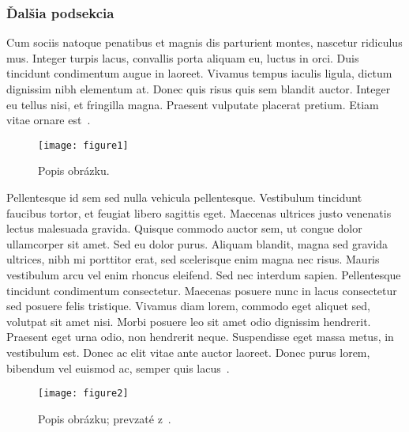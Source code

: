 
\subsubsection{Ďalšia podsekcia}
Cum sociis natoque penatibus et magnis dis parturient montes, nascetur ridiculus mus. Integer turpis lacus, convallis porta aliquam eu, luctus in orci. Duis tincidunt condimentum augue in laoreet. Vivamus tempus iaculis ligula, dictum dignissim nibh elementum at. Donec quis risus quis sem blandit auctor. Integer eu tellus nisi, et fringilla magna. Praesent vulputate placerat pretium. Etiam vitae ornare est~\cite{2}.\\

\begin{figure}[H]\begin{center}\texttt{[image: figure1]}
\caption{Popis obrázku.}\label{figure1}\end{center}\end{figure}

Pellentesque id sem sed nulla vehicula pellentesque. Vestibulum tincidunt faucibus tortor, et feugiat libero sagittis eget. Maecenas ultrices justo venenatis lectus malesuada gravida. Quisque commodo auctor sem, ut congue dolor ullamcorper sit amet. Sed eu dolor purus. Aliquam blandit, magna sed gravida ultrices, nibh mi porttitor erat, sed scelerisque enim magna nec risus. Mauris vestibulum arcu vel enim rhoncus eleifend. Sed nec interdum sapien. Pellentesque tincidunt condimentum consectetur. Maecenas posuere nunc in lacus consectetur sed posuere felis tristique. Vivamus diam lorem, commodo eget aliquet sed, volutpat sit amet nisi. Morbi posuere leo sit amet odio dignissim hendrerit. Praesent eget urna odio, non hendrerit neque. Suspendisse eget massa metus, in vestibulum est. Donec ac elit vitae ante auctor laoreet. Donec purus lorem, bibendum vel euismod ac, semper quis lacus~\cite{3}.

\begin{figure}[H]\begin{center}\texttt{[image: figure2]}
\caption{Popis obrázku; prevzaté z~\cite{3}.}\label{pic1}\end{center}
\end{figure}

